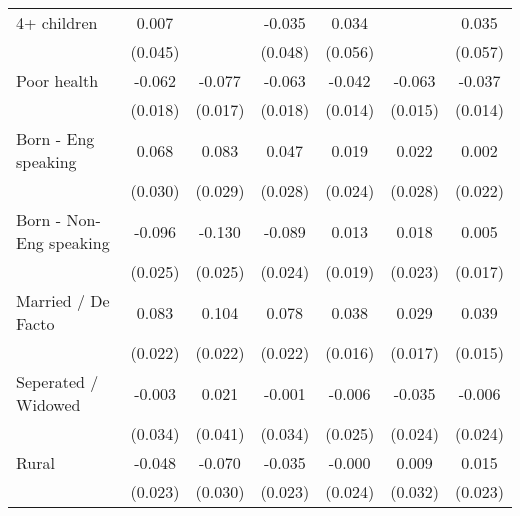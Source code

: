 {\begin{tabular}{l*{6}{c}}
4+ children         &       0.007         &                     &      -0.035         &       0.034         &                     &       0.035         \\
                    &     (0.045)         &                     &     (0.048)         &     (0.056)         &                     &     (0.057)         \\
Poor health         &      -0.062\sym{***}&      -0.077\sym{***}&      -0.063\sym{***}&      -0.042\sym{***}&      -0.063\sym{***}&      -0.037\sym{***}\\
                    &     (0.018)         &     (0.017)         &     (0.018)         &     (0.014)         &     (0.015)         &     (0.014)         \\
Born - Eng speaking &       0.068\sym{**} &       0.083\sym{***}&       0.047\sym{*}  &       0.019         &       0.022         &       0.002         \\
                    &     (0.030)         &     (0.029)         &     (0.028)         &     (0.024)         &     (0.028)         &     (0.022)         \\
Born - Non-Eng speaking&      -0.096\sym{***}&      -0.130\sym{***}&      -0.089\sym{***}&       0.013         &       0.018         &       0.005         \\
                    &     (0.025)         &     (0.025)         &     (0.024)         &     (0.019)         &     (0.023)         &     (0.017)         \\
Married / De Facto  &       0.083\sym{***}&       0.104\sym{***}&       0.078\sym{***}&       0.038\sym{**} &       0.029\sym{*}  &       0.039\sym{**} \\
                    &     (0.022)         &     (0.022)         &     (0.022)         &     (0.016)         &     (0.017)         &     (0.015)         \\
Seperated / Widowed &      -0.003         &       0.021         &      -0.001         &      -0.006         &      -0.035         &      -0.006         \\
                    &     (0.034)         &     (0.041)         &     (0.034)         &     (0.025)         &     (0.024)         &     (0.024)         \\
Rural               &      -0.048\sym{**} &      -0.070\sym{**} &      -0.035         &      -0.000         &       0.009         &       0.015         \\
                    &     (0.023)         &     (0.030)         &     (0.023)         &     (0.024)         &     (0.032)         &     (0.023)         \\

\end{tabular}}
